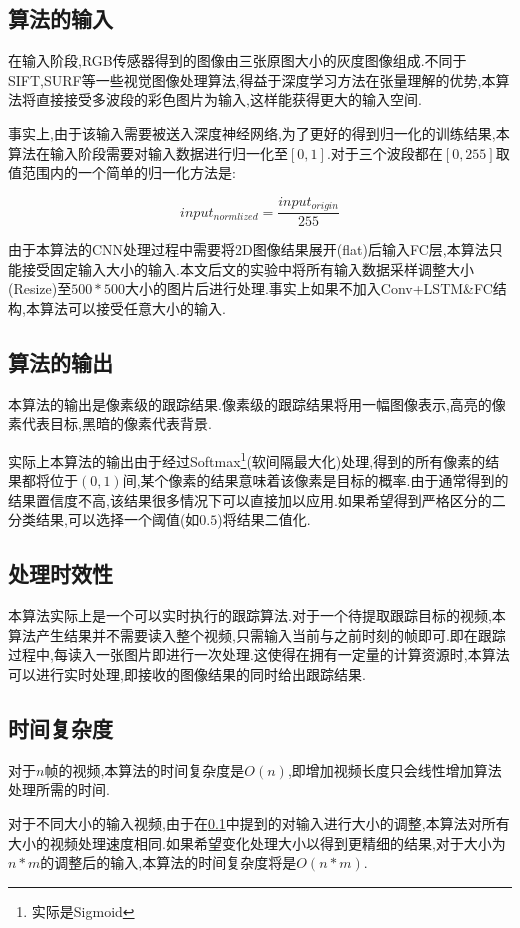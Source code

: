 \subsection{算法的输入} \label{section:input_of_our_algorithm}
\par
在输入阶段,RGB传感器得到的图像由三张原图大小的灰度图像组成.不同于SIFT\supercite{lowe1999object},SURF\supercite{bay2006surf}等一些视觉图像处理算法,得益于深度学习方法在张量理解的优势,本算法将直接接受多波段的彩色图片为输入,这样能获得更大的输入空间.
\par
事实上,由于该输入需要被送入深度神经网络,为了更好的得到归一化的训练结果,本算法在输入阶段需要对输入数据进行归一化至$[0,1]$.对于三个波段都在$[0,255]$取值范围内的一个简单的归一化方法是:
\par
\begin{equation}\label{equ:input_norm}  input_{normlized} = \frac{input_{origin}}{255}  \end{equation}
\par
由于本算法的CNN处理过程中需要将2D图像结果展开(flat)后输入FC层,本算法只能接受固定输入大小的输入.本文后文的实验中将所有输入数据采样调整大小(Resize)至$500*500$大小的图片后进行处理.事实上如果不加入Conv+LSTM\&FC结构,本算法可以接受任意大小的输入.
\par

\subsection{算法的输出}
本算法的输出是像素级的跟踪结果.像素级的跟踪结果将用一幅图像表示,高亮的像素代表目标,黑暗的像素代表背景.
\par
实际上本算法的输出由于经过Softmax\footnote{实际是Sigmoid}(软间隔最大化)处理,得到的所有像素的结果都将位于$(0,1)$间,某个像素的结果意味着该像素是目标的概率.由于通常得到的结果置信度不高,该结果很多情况下可以直接加以应用.如果希望得到严格区分的二分类结果,可以选择一个阈值(如$0.5$)将结果二值化.

\subsection{处理时效性}
本算法实际上是一个可以实时执行的跟踪算法.对于一个待提取跟踪目标的视频,本算法产生结果并不需要读入整个视频,只需输入当前与之前时刻的帧即可.即在跟踪过程中,每读入一张图片即进行一次处理.这使得在拥有一定量的计算资源时,本算法可以进行实时处理,即接收的图像结果的同时给出跟踪结果.

\subsection{时间复杂度}
对于$n$帧的视频,本算法的时间复杂度是$O(n)$,即增加视频长度只会线性增加算法处理所需的时间.
\par
对于不同大小的输入视频,由于在\ref{section:input_of_our_algorithm}中提到的对输入进行大小的调整,本算法对所有大小的视频处理速度相同.如果希望变化处理大小以得到更精细的结果,对于大小为$n*m$的调整后的输入,本算法的时间复杂度将是$O(n*m)$.

